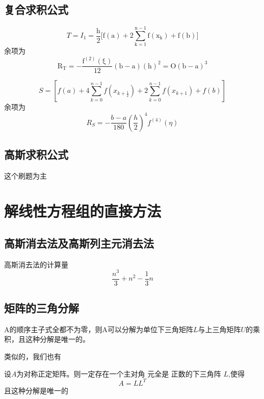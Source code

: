 \documentclass[lang=cn,14pt]{elegantbook}
\begin{document}
	\section{复合求积公式}
		\begin{definition}
		\begin{equation*}
		T=I_1=\frac{\mathrm{h}}{2}[\mathrm{f(a)}+2\sum_{\mathrm{k}=1}^{\mathrm{n}-1}{\mathrm{f}}(\mathrm{x}_{\mathrm{k}})+\mathrm{f(b)]}
		\end{equation*}
		余项为
		\begin{equation*}
			\mathrm{R_T=-\frac{f^{(2)}(\xi)}{12}(b-a)(h)^2=O(b-a)^3}
		\end{equation*}
	\end{definition}
	\begin{definition}
		\begin{equation*}
			S=[f(a)+4\sum_{k=0}^{n-1}f(x_{k+\frac12})+2\sum_{k=0}^{n-1}f(x_{k+1})+f(b)]
		\end{equation*}
		余项为
		\begin{equation*}
			R_S =-\frac{b-a}{180}(\frac{h}2)^4f^{(4)}(\eta)
		\end{equation*}
	\end{definition}
	\section{高斯求积公式}
	这个刷题为主
	\chapter{解线性方程组的直接方法}
	\section{高斯消去法及高斯列主元消去法}
	高斯消去法的计算量
	\begin{equation*}
		\frac{n^3}3+n^2-\frac13n
	\end{equation*}
	\section{矩阵的三角分解}
	\begin{theorem}
		A的顺序主子式全都不为零，则A可以分解为单位下三角矩阵$L$与上三角矩阵$U$的乘积，且这种分解是唯一的。
	\end{theorem}
	类似的，我们也有
	\begin{theorem}
		设$A$为对称正定矩阵。则一定存在一个主对角 元全是	
		正数的下三角阵 $L$,使得
		\begin{equation*}
			A=LL^T
		\end{equation*}
		且这种分解是唯一的
	\end{theorem}
\end{document}
